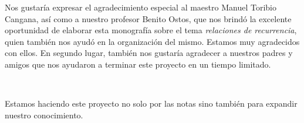 \begin{acknowledgement}
Nos gustaría expresar el agradecimiento especial al maestro Manuel Toribio Cangana, así como a nuestro profesor Benito Ostos, que nos brindó la excelente oportunidad de elaborar esta monografía sobre el tema \emph{relaciones de recurrencia}, quien también nos ayudó en la organización del mismo. Estamos muy agradecidos con ellos. En segundo lugar, también nos gustaría agradecer a nuestros padres y amigos que nos ayudaron a terminar este proyecto en un tiempo limitado.\par

\

Estamos haciendo este proyecto no solo por las notas sino también para expandir nuestro conocimiento.
\end{acknowledgement}
